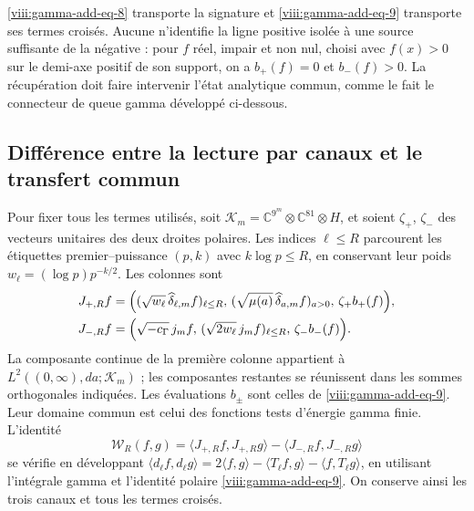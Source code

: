 \eqref{viii:gamma-add-eq-8} transporte la signature et \eqref{viii:gamma-add-eq-9} transporte ses termes croisés. Aucune n'identifie la ligne positive isolée à une source suffisante de la négative : pour \(f\) réel, impair et non nul, choisi avec \(f(x)>0\) sur le demi-axe positif de son support, on a \(b_+(f)=0\) et \(b_-(f)>0\). La récupération doit faire intervenir l'état analytique commun, comme le fait le connecteur de queue gamma développé ci-dessous.

\subsection{Différence entre la lecture par canaux et le transfert commun}
\label{viii:gamma-add-sub-259}

Pour fixer tous les termes utilisés, soit
\(\mathcal K_m=\mathbb C^{9^m}\otimes\mathbb C^{81}\otimes H\),
et soient \(\zeta_+\), \(\zeta_-\) des vecteurs unitaires des deux
droites polaires. Les indices \(\ell\leq R\) parcourent les étiquettes
premier--puissance \((p,k)\) avec \(k\log p\leq R\), en conservant
leur poids \(w_\ell=(\log p)p^{-k/2}\). Les colonnes sont
\begin{equation}
\begin{aligned}
J_{+,R}f={}&\Bigl(
 (\sqrt{w_\ell}\,\widehat\delta_{\ell,m}f)_{\ell\leq R},\,
 (\sqrt{\mu(a)}\,\widehat\delta_{a,m}f)_{a>0},\,
 \zeta_+b_+(f)\Bigr),\\
J_{-,R}f={}&\Bigl(
 \sqrt{-c_\Gamma}\,j_mf,\,
 (\sqrt{2w_\ell}\,j_mf)_{\ell\leq R},\,
 \zeta_-b_-(f)\Bigr).
\end{aligned}
\label{viii:gamma-add-columnas-completas}
\end{equation}
La composante continue de la première colonne appartient à \(L^2((0,\infty),da;\mathcal K_m)\) ; les composantes restantes se réunissent dans les sommes orthogonales indiquées. Les évaluations \(b_\pm\) sont celles de \eqref{viii:gamma-add-eq-9}. Leur domaine commun est celui des fonctions tests d'énergie gamma finie. L'identité
\begin{equation}
\mathscr W_R(f,g)
=\langle J_{+,R}f,J_{+,R}g\rangle
 -\langle J_{-,R}f,J_{-,R}g\rangle
\label{viii:gamma-add-diferencia-columnas}
\end{equation}
se vérifie en développant
\(\langle d_\ell f,d_\ell g\rangle
=2\langle f,g\rangle-\langle T_\ell f,g\rangle
-\langle f,T_\ell g\rangle\), en utilisant l'intégrale gamma
et l'identité polaire \eqref{viii:gamma-add-eq-9}. On conserve ainsi
les trois canaux et tous les termes croisés.

